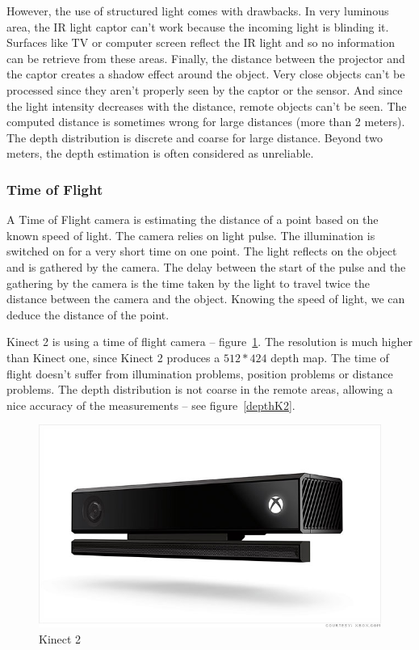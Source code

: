 \documentclass[12pt]{article}
\begin{document}
However, the use of structured light comes with drawbacks. In very luminous area, the IR light captor can't work because the incoming light is blinding it. Surfaces like TV or computer screen reflect the IR light and so no information can be retrieve from these areas. Finally, the distance between the projector and the captor creates a shadow effect around the object. Very close objects can't be processed since they aren't properly seen by the captor or the sensor. And since the light intensity decreases with the distance, remote objects can't be seen. The computed distance is sometimes wrong for large distances (more than 2 meters). The depth distribution is discrete and coarse for large distance. Beyond two meters, the depth estimation is often considered as unreliable.

\subsubsection{Time of Flight}
A Time of Flight camera is estimating the distance of a point based on the known speed of light. The camera relies on light pulse. The illumination is switched on for a very short time on one point. The light reflects on the object and is gathered by the camera. The delay between the start of the pulse and the gathering by the camera is the time taken by the light to travel twice the distance between the camera and the object. Knowing the speed of light, we can deduce the distance of the point.

Kinect 2 is using a time of flight camera -- figure~\ref{kinect2}. The resolution is much higher than Kinect one, since Kinect 2 produces a $512*424$ depth map. The time of flight doesn't suffer from illumination problems, position problems or distance problems. The depth distribution is not coarse in the remote areas, allowing a nice accuracy of the measurements -- see figure~\ref{depthK2}.

\begin{figure}[h]
  \centering
  \includegraphics[scale=0.3]{kinect2.jpg}
  \caption{\label{kinect2} Kinect 2}
\end{figure}
\end{document}

